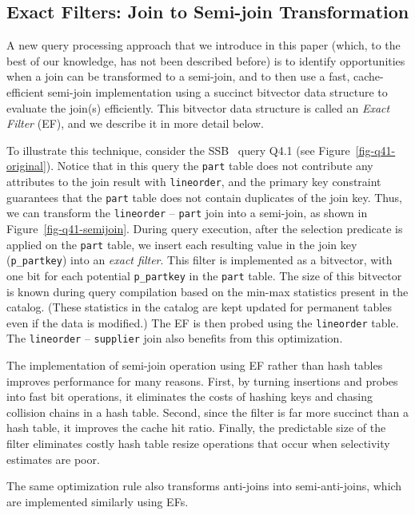 \subsection{Exact Filters: Join to Semi-join Transformation} \label{sec:ef}
A new query processing approach that we introduce in this paper (which, to the best of our knowledge, has not been described before) is to identify opportunities when a join can be transformed to a semi-join, and to then use a  fast, cache-efficient semi-join implementation using a succinct bitvector data structure to evaluate the join(s) efficiently. This bitvector data structure is called an \textit{Exact Filter} (EF), and we describe it in more detail below.



To illustrate this technique, consider the SSB~\cite{ssb} query Q4.1 (see Figure~\ref{fig-q41-original}). Notice that in this query the \texttt{part} table does not contribute any attributes to the join result with \texttt{lineorder}, and the primary key constraint guarantees that the \texttt{part} table does not contain duplicates of the join key. Thus, we can transform the \texttt{lineorder} -- \texttt{part} join into a semi-join, as shown in Figure~\ref{fig-q41-semijoin}. During query execution, after the selection predicate is applied on the \texttt{part} table, we insert each resulting value in the join key (\texttt{p\_partkey}) into an \textit{exact filter}. This filter is implemented as a bitvector, with one bit for each potential \texttt{p\_partkey} in the  \texttt{part} table. The size of this bitvector is known during query compilation based on the min-max statistics present in the catalog. (These statistics in the catalog are  kept updated for permanent tables even if the data is modified.) The EF is then probed using the \texttt{lineorder} table. The \texttt{lineorder} -- \texttt{supplier} join also benefits from this optimization.

The implementation of semi-join operation using EF rather than hash tables improves performance for many reasons. First, by turning insertions and probes into fast bit operations, it eliminates the costs of hashing keys and chasing collision chains in a hash table. Second, since the filter is far more succinct than a hash table, it improves the cache hit ratio. Finally, the predictable size of the filter eliminates costly hash table resize operations that occur when selectivity estimates are poor.

The same optimization rule also transforms anti-joins into semi-anti-joins, which are implemented similarly using EFs.

